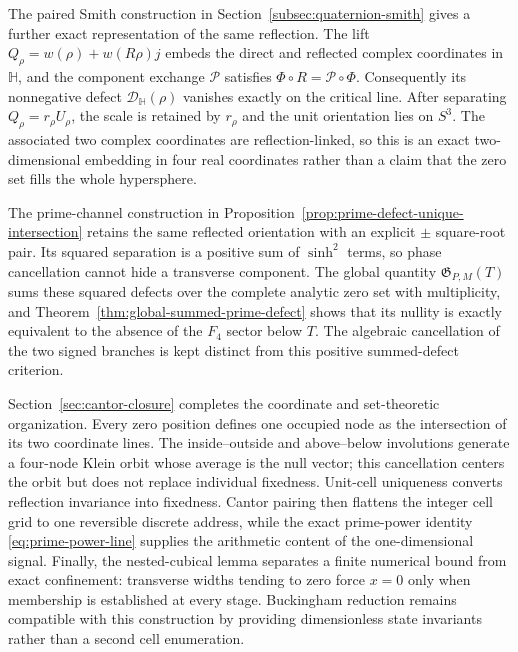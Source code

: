 \documentclass[11pt]{amsart}
\theoremstyle{definition}
\theoremstyle{remark}
\begin{document}
The paired Smith construction in Section~\ref{subsec:quaternion-smith} gives a further exact
representation of the same reflection.  The lift
$Q_\rho=w(\rho)+w(R\rho)j$ embeds the direct and reflected complex coordinates in
$\mathbb H$, and the component exchange $\mathcal P$ satisfies
$\Phi\circ R=\mathcal P\circ\Phi$.  Consequently its nonnegative defect
$\mathcal D_{\mathbb H}(\rho)$ vanishes exactly on the critical line.  After separating
$Q_\rho=r_\rho U_\rho$, the scale is retained by $r_\rho$ and the unit orientation lies on
$S^3$.  The associated two complex coordinates are reflection-linked, so this is an exact
two-dimensional embedding in four real coordinates rather than a claim that the zero set
fills the whole hypersphere.

The prime-channel construction in Proposition~\ref{prop:prime-defect-unique-intersection}
retains the same reflected orientation with an explicit $\pm$ square-root pair.  Its squared
separation is a positive sum of $\sinh^2$ terms, so phase cancellation cannot hide a transverse
component.  The global quantity $\mathfrak G_{P,M}(T)$ sums these squared defects over the
complete analytic zero set with multiplicity, and Theorem~\ref{thm:global-summed-prime-defect}
shows that its nullity is exactly equivalent to the absence of the $F_4$ sector below $T$.
The algebraic cancellation of the two signed branches is kept distinct from this positive
summed-defect criterion.

Section~\ref{sec:cantor-closure} completes the coordinate and set-theoretic organization.
Every zero position defines one occupied node as the intersection of its two coordinate lines.
The inside--outside and above--below involutions generate a four-node Klein orbit whose average
is the null vector; this cancellation centers the orbit but does not replace individual
fixedness.  Unit-cell uniqueness converts reflection invariance into fixedness.  Cantor pairing
then flattens the integer cell grid to one reversible discrete address, while the exact
prime-power identity \eqref{eq:prime-power-line} supplies the arithmetic content of the
one-dimensional signal.  Finally, the nested-cubical lemma separates a finite numerical bound
from exact confinement: transverse widths tending to zero force $x=0$ only when membership is
established at every stage.  Buckingham reduction remains compatible with this construction by
providing dimensionless state invariants rather than a second cell enumeration.
\end{document}
